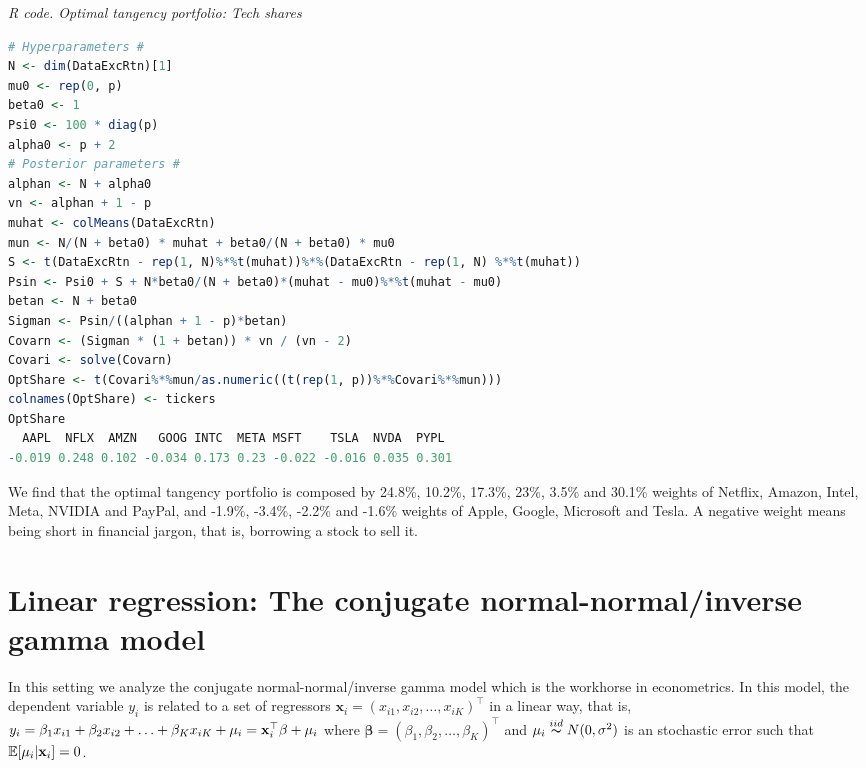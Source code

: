 \begin{enumerate}
\begin{tcolorbox}[enhanced,width=4.67in,center upper,
	fontupper=\large\bfseries,drop shadow southwest,sharp corners]
	\textit{R code. Optimal tangency portfolio: Tech shares}
\begin{VF}
\begin{lstlisting}[language=R]
# Hyperparameters #
N <- dim(DataExcRtn)[1]
mu0 <- rep(0, p)
beta0 <- 1
Psi0 <- 100 * diag(p)
alpha0 <- p + 2
# Posterior parameters #
alphan <- N + alpha0
vn <- alphan + 1 - p
muhat <- colMeans(DataExcRtn)
mun <- N/(N + beta0) * muhat + beta0/(N + beta0) * mu0
S <- t(DataExcRtn - rep(1, N)%*%t(muhat))%*%(DataExcRtn - rep(1, N) %*%t(muhat)) 
Psin <- Psi0 + S + N*beta0/(N + beta0)*(muhat - mu0)%*%t(muhat - mu0)
betan <- N + beta0
Sigman <- Psin/((alphan + 1 - p)*betan)
Covarn <- (Sigman * (1 + betan)) * vn / (vn - 2)
Covari <- solve(Covarn)
OptShare <- t(Covari%*%mun/as.numeric((t(rep(1, p))%*%Covari%*%mun)))
colnames(OptShare) <- tickers
OptShare
  AAPL  NFLX  AMZN   GOOG INTC  META MSFT    TSLA  NVDA  PYPL
-0.019 0.248 0.102 -0.034 0.173 0.23 -0.022 -0.016 0.035 0.301
\end{lstlisting}
\end{VF}
\end{tcolorbox}

We find that the optimal tangency portfolio is composed by 24.8\%, 10.2\%, 17.3\%, 23\%, 3.5\% and 30.1\% weights of Netflix, Amazon, Intel, Meta, NVIDIA and PayPal, and -1.9\%, -3.4\%, -2.2\% and -1.6\% weights of Apple, Google, Microsoft and Tesla. A negative weight means being short in financial jargon, that is, borrowing a stock to sell it.
\end{enumerate}


\section{Linear regression: The conjugate normal-normal/inverse gamma model}\label{sec33}

In this setting we analyze the conjugate normal-normal/inverse gamma model which is the workhorse in econometrics. In this model, the dependent variable $y_i$ is related to a set of regressors ${\mathbf{x}}_i=(x_{i1},x_{i2},\ldots,x_{iK})^{\top}$ in a linear way, that is, $y_i=\beta_1x_{i1}+\beta_2x_{i2}+\ldots+\beta_Kx_{iK}+\mu_i={\bf{x}}_i^{\top}\beta+\mu_i$ where $\mathbf{\beta}=(\beta_1,\beta_2,\ldots,\beta_K)^{\top}$ and $\mu_i\stackrel{iid} {\thicksim}N(0,\sigma^2)$ is an stochastic error such that $\mathbb{E}[\mu_i|{\bf{x}}_i]=0$.

